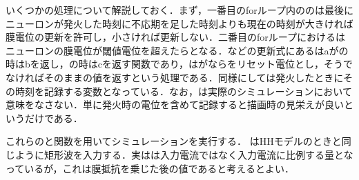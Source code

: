 いくつかの処理について解説しておく．まず，一番目のforループ内ののは最後にニューロンが発火した時刻に不応期を足した時刻よりも現在の時刻が大きければ膜電位の更新を許可し，小さければ更新しない．二番目のforループにおけるはニューロンの膜電位が閾値電位を超えたらとなる．などの更新式にあるはaがの時はbを返し，の時はcを返す関数であり，はがならをリセット電位とし，そうでなければそのままの値を返すという処理である．同様にしては発火したときにその時刻を記録する変数となっている．なお，は実際のシミュレーションにおいて意味をなさない．単に発火時の電位を含めて記録すると描画時の見栄えが良いというだけである．

これらのと関数を用いてシミュレーションを実行する． はHHモデルのときと同じように矩形波を入力する．実はは入力電流ではなく入力電流に比例する量となっているが，これは膜抵抗を乗じた後の値であると考えるとよい．
